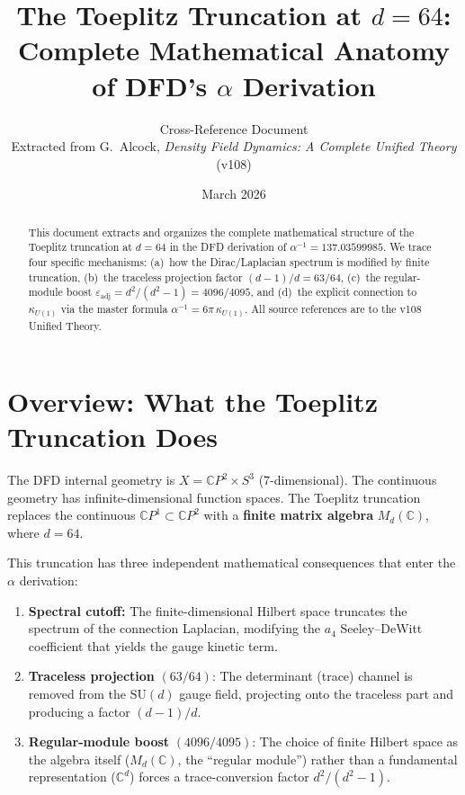\documentclass[12pt,a4paper]{article}
\title{The Toeplitz Truncation at $d=64$:\\[6pt]
\large Complete Mathematical Anatomy of DFD's $\alpha$ Derivation}
\author{Cross-Reference Document\\
Extracted from G.\ Alcock, \textit{Density Field Dynamics: A Complete Unified Theory} (v108)}
\date{March 2026}
\begin{document}
\maketitle

\begin{abstract}
This document extracts and organizes the complete mathematical structure of the
Toeplitz truncation at $d=64$ in the DFD derivation of $\alpha^{-1} = 137.03599985$.
We trace four specific mechanisms: (a)~how the Dirac/Laplacian spectrum is modified
by finite truncation, (b)~the traceless projection factor $(d-1)/d = 63/64$,
(c)~the regular-module boost $\varepsilon_{\mathrm{adj}} = d^2/(d^2-1) = 4096/4095$,
and (d)~the explicit connection to $\kappa_{U(1)}$ via the master formula
$\alpha^{-1} = 6\pi\,\kappa_{U(1)}$.
All source references are to the v108 Unified Theory.
\end{abstract}

\tableofcontents
\newpage

\section{Overview: What the Toeplitz Truncation Does}
\label{sec:overview}

The DFD internal geometry is $X = \mathbb{C}P^2 \times S^3$ (7-dimensional).
The continuous geometry has infinite-dimensional function spaces. The Toeplitz
truncation replaces the continuous $\mathbb{C}P^1 \subset \mathbb{C}P^2$ with
a \textbf{finite matrix algebra} $M_d(\mathbb{C})$, where $d = 64$.

This truncation has three independent mathematical consequences that enter the
$\alpha$ derivation:

\begin{enumerate}
\item \textbf{Spectral cutoff:} The finite-dimensional Hilbert space truncates
  the spectrum of the connection Laplacian, modifying the $a_4$ Seeley--DeWitt
  coefficient that yields the gauge kinetic term.

\item \textbf{Traceless projection} $(63/64)$: The determinant (trace) channel
  is removed from the $\mathrm{SU}(d)$ gauge field, projecting onto the
  traceless part and producing a factor $(d-1)/d$.

\item \textbf{Regular-module boost} $(4096/4095)$: The choice of finite Hilbert
  space as the algebra itself ($M_d(\mathbb{C})$, the ``regular module'') rather
  than a fundamental representation ($\mathbb{C}^d$) forces a trace-conversion
  factor $d^2/(d^2-1)$.
\end{enumerate}
\end{document}
